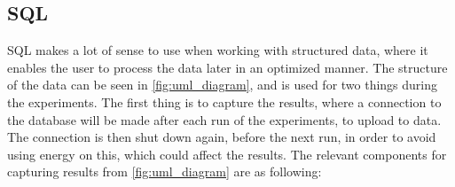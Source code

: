 \subsection{SQL}\label{subsec:sql}

SQL makes a lot of sense to use when working with structured data, where it enables the user to process the data later in an optimized manner. The structure of the data can be seen in \cref{fig:uml_diagram}, and is used for two things during the experiments. The first thing is to capture the results, where a connection to the database will be made after each run of the experiments, to upload to data. The connection is then shut down again, before the next run, in order to avoid using energy on this, which could affect the results. The relevant components for capturing results from \cref*{fig:uml_diagram} are as following:

